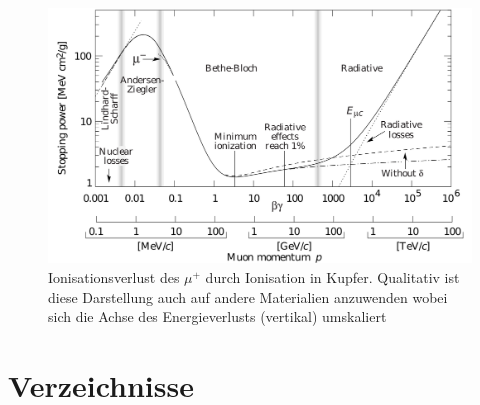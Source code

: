 \documentclass[slug=LM, room=Andreas-Schubert-Bau\,\ K\ 1A, supervisor=Anne-Sophie\ Berthold, coursedate=13.\ 12.\ 2019]{../../Lab_Report_LaTeX/lab_report}
\begin{document}
\begin{figure}[H]\centering
  \includegraphics[width=\columnwidth]{./muon_stopp.png}
  \caption{Ionisationsverlust des \(\mu^{+}\) durch Ionisation in
    Kupfer\cite{GROOM2001183}. Qualitativ ist diese Darstellung auch
    auf andere Materialien anzuwenden wobei sich die Achse des
    Energieverlusts (vertikal) umskaliert}
  \label{fig:muonbbloch}
\end{figure}


\section{Verzeichnisse}

\label{sec:literatur}

\listoffigures

\listoftables

\printbibliography
\end{document}
